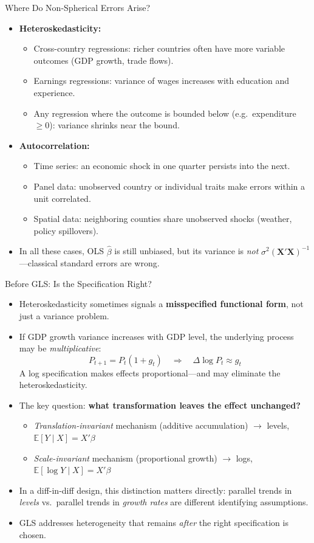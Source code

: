 \documentclass[aspectratio=169, handout]{beamer}
\numberwithin{equation}{section}
\begin{document}
\begin{frame}{Where Do Non-Spherical Errors Arise?}
\begin{itemize}
\item \textbf{Heteroskedasticity:}
\begin{itemize}
\item Cross-country regressions: richer countries often have more variable outcomes (GDP growth, trade flows).
\item Earnings regressions: variance of wages increases with education and experience.
\item Any regression where the outcome is bounded below (e.g.\ expenditure $\geq 0$): variance shrinks near the bound.
\end{itemize}\pause
\item \textbf{Autocorrelation:}
\begin{itemize}
\item Time series: an economic shock in one quarter persists into the next.
\item Panel data: unobserved country or individual traits make errors within a unit correlated.
\item Spatial data: neighboring counties share unobserved shocks (weather, policy spillovers).
\end{itemize}\pause
\item In all these cases, OLS $\hat{\beta}$ is still unbiased, but its variance is \emph{not} $\sigma^2(\bm{X'X})^{-1}$---classical standard errors are wrong.
\end{itemize}
\end{frame}

\begin{frame}{Before GLS: Is the Specification Right?}
\begin{itemize}
\item Heteroskedasticity sometimes signals a \textbf{misspecified functional form}, not just a variance problem.\pause
\item If GDP growth variance increases with GDP level, the underlying process may be \emph{multiplicative}:
$$P_{t+1}=P_t(1+g_t)\quad\Rightarrow\quad \Delta\log P_t\approx g_t$$
A log specification makes effects proportional---and may eliminate the heteroskedasticity.\pause
\item The key question: \textbf{what transformation leaves the effect unchanged?}
\begin{itemize}
\item \emph{Translation-invariant} mechanism (additive accumulation) $\to$ levels, $\mathbb{E}[Y\mid X]=X'\beta$
\item \emph{Scale-invariant} mechanism (proportional growth) $\to$ logs, $\mathbb{E}[\log Y\mid X]=X'\beta$
\end{itemize}\pause
\item In a diff-in-diff design, this distinction matters directly: parallel trends in \emph{levels} vs.\ parallel trends in \emph{growth rates} are different identifying assumptions.
\item GLS addresses heterogeneity that remains \emph{after} the right specification is chosen.
\end{itemize}
\end{frame}
\end{document}
